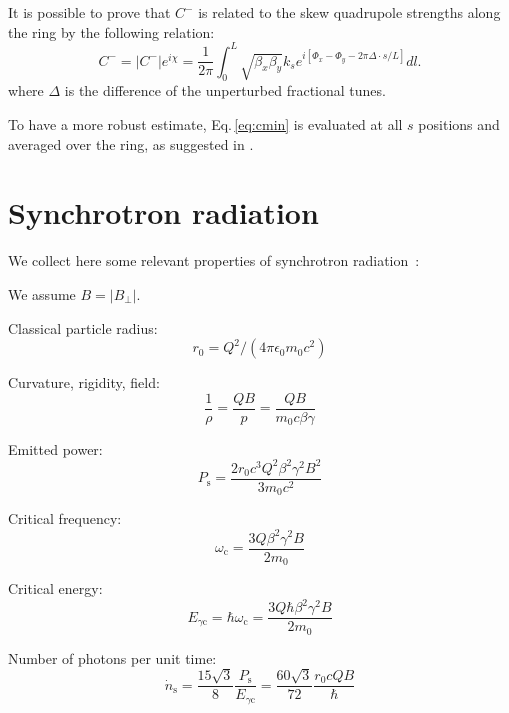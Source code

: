 It is possible to prove that $C^-$ is related to the skew quadrupole strengths along the ring by the following relation:
\begin{equation}
C^{-}=\left|C^{-}\right| e^{i \chi}=\frac{1}{2 \pi} \int_0^L \sqrt{\beta_x \beta_y} k_s e^{i\left[\Phi_x-\Phi_y-2 \pi \Delta \cdot s / L\right]} d l .
\end{equation}
where $\Delta$ is the difference of the unperturbed fractional tunes.

To have a more robust estimate, Eq.\,\ref{eq:cmin} is evaluated at all $s$ positions
and averaged over the ring, as suggested in \cite{tobias_coupling_note}.




\chapter{Synchrotron radiation}

We collect here some relevant properties of synchrotron radiation~\cite{hofmann_2004}:

We assume $B = |B_\perp|$.

Classical particle radius:
\begin{equation}
r_0=Q^2 /\left(4 \pi \epsilon_0 m_0 c^2\right)
\end{equation}

Curvature, rigidity, field:
\begin{equation}
\frac{1}{\rho}=\frac{Q B}{p}=\frac{Q B}{m_0 c \beta \gamma}
\end{equation}

Emitted power:
\begin{equation}
P_{\mathrm{s}}=\frac{2 r_0 c^3 Q^2 \beta^2 \gamma^2 B^2}{3 m_0 c^2}
\end{equation}



Critical frequency:
\begin{equation}
\omega_{\mathrm{c}}=\frac{3 Q \beta^2 \gamma^2 B }{2 m_0}
\end{equation}

Critical energy:
\begin{equation}
E_{\gamma \mathrm{c}}=\hbar \omega_{\mathrm{c}}
=\frac{3 Q \hbar\beta^2 \gamma^2 B }{2 m_0}
\end{equation}

Number of photons per unit time:
\begin{equation}
\dot{n}_{\mathrm{s}}=\frac{15 \sqrt{3}}{8}\frac{P_{\mathrm{s}}}{E_{\gamma \mathrm{c}}} 
=\frac{60 \sqrt{3}}{72}
\frac{ r_0 c Q B}{\hbar}
\end{equation}


